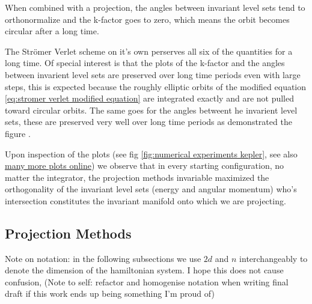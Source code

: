 \documentclass[12pt]{article}
\begin{document}
When combined with a projection, the angles between invariant level sets tend to orthonormalize and the k-factor goes to zero, which means the orbit becomes circular after a long time. 

The Str\"omer Verlet scheme on it's own perserves all six of the quantities for a long time. Of special interest is that the plots of the k-factor and the angles between invarient level sets are preserved over long time periods even with large steps, this is expected because the roughly elliptic orbits of the modified equation \eqref{eq:stromer verlet modified equation} are integrated exactly and are not pulled toward circular orbits. The same goes for the angles betweent he invarient level sets, these are preserved very well over long time periods as demonstrated the figure . 

Upon inspection of the plots (see fig \ref{fig:numerical experiments kepler}, see also \href{https://github.com/dcxSt/numerical_integrators/tree/master/figures/gallary}{many more plots online}) we observe that in every starting configuration, no matter the integrator, the projection methods invariable maximized the orthogonality of the invariant level sets (energy and angular momentum) who's intersection constitutes the invariant manifold onto which we are projecting.  



\subsection{Projection Methods}

Note on notation: in the following subsections we use $2d$ and $n$ interchangeably to denote the dimension of the hamiltonian system. I hope this does not cause confusion, (Note to self: refactor and homogenise notation when writing final draft if this work ends up being something I'm proud of) 
\end{document}
